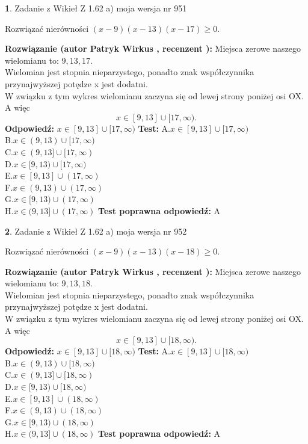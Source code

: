 \documentclass[12pt, a4paper]{article}
\theoremstyle{definition} %
\newtheorem{zad}{}
\newcommand{\zadStart}[1]{\begin{zad}#1\newline}
\newcommand{\zadStop}{\end{zad}}
\newcommand{\rozwStart}[2]{\noindent \textbf{Rozwiązanie (autor #1 , recenzent #2): }\newline}
\newcommand{\rozwStop}{\newline}
\newcommand{\odpStart}{\noindent \textbf{Odpowiedź:}\newline}
\newcommand{\odpStop}{\newline}
\newcommand{\testStart}{\noindent \textbf{Test:}\newline}
\newcommand{\testStop}{\newline}
\newcommand{\kluczStart}{\noindent \textbf{Test poprawna odpowiedź:}\newline}
\newcommand{\kluczStop}{\newline}
\begin{document}
\zadStart{Zadanie z Wikieł Z 1.62 a) moja wersja nr 951}

Rozwiązać nierówności $(x-9)(x-13)(x-17)\ge0$.
\zadStop
\rozwStart{Patryk Wirkus}{}
Miejsca zerowe naszego wielomianu to: $9, 13, 17$.\\
Wielomian jest stopnia nieparzystego, ponadto znak współczynnika przy\linebreak najwyższej potędze x jest dodatni.\\ W związku z tym wykres wielomianu zaczyna się od lewej strony poniżej osi OX. A więc $$x \in [9,13] \cup [17,\infty).$$
\rozwStop
\odpStart
$x \in [9,13] \cup [17,\infty)$
\odpStop
\testStart
A.$x \in [9,13] \cup [17,\infty)$\\
B.$x \in (9,13) \cup [17,\infty)$\\
C.$x \in (9,13] \cup [17,\infty)$\\
D.$x \in [9,13) \cup [17,\infty)$\\
E.$x \in [9,13] \cup (17,\infty)$\\
F.$x \in (9,13) \cup (17,\infty)$\\
G.$x \in [9,13) \cup (17,\infty)$\\
H.$x \in (9,13] \cup (17,\infty)$
\testStop
\kluczStart
A
\kluczStop



\zadStart{Zadanie z Wikieł Z 1.62 a) moja wersja nr 952}

Rozwiązać nierówności $(x-9)(x-13)(x-18)\ge0$.
\zadStop
\rozwStart{Patryk Wirkus}{}
Miejsca zerowe naszego wielomianu to: $9, 13, 18$.\\
Wielomian jest stopnia nieparzystego, ponadto znak współczynnika przy\linebreak najwyższej potędze x jest dodatni.\\ W związku z tym wykres wielomianu zaczyna się od lewej strony poniżej osi OX. A więc $$x \in [9,13] \cup [18,\infty).$$
\rozwStop
\odpStart
$x \in [9,13] \cup [18,\infty)$
\odpStop
\testStart
A.$x \in [9,13] \cup [18,\infty)$\\
B.$x \in (9,13) \cup [18,\infty)$\\
C.$x \in (9,13] \cup [18,\infty)$\\
D.$x \in [9,13) \cup [18,\infty)$\\
E.$x \in [9,13] \cup (18,\infty)$\\
F.$x \in (9,13) \cup (18,\infty)$\\
G.$x \in [9,13) \cup (18,\infty)$\\
H.$x \in (9,13] \cup (18,\infty)$
\testStop
\kluczStart
A
\kluczStop
\end{document}
